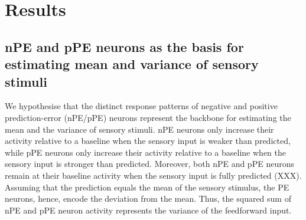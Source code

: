 \documentclass[10pt,a4paper]{article}
\begin{document}
\section*{Results}
%

\subsection*{nPE and pPE neurons as the basis for estimating mean and variance of sensory stimuli}
%
We hypothesise that the distinct response patterns of negative and positive prediction-error (nPE/pPE) neurons represent the backbone for estimating the mean and the variance of sensory stimuli. nPE neurons only increase their activity relative to a baseline when the sensory input is weaker than predicted, while pPE neurons only increase their activity relative to a baseline when the sensory input is stronger than predicted. Moreover, both nPE and pPE neurons remain at their baseline activity when the sensory input is fully predicted (XXX). Assuming that the prediction equals the mean of the sensory stimulus, the PE neurons, hence, encode the deviation from the mean. Thus, the squared sum of nPE and pPE neuron activity represents the variance of the feedforward input. 
%
\end{document}
